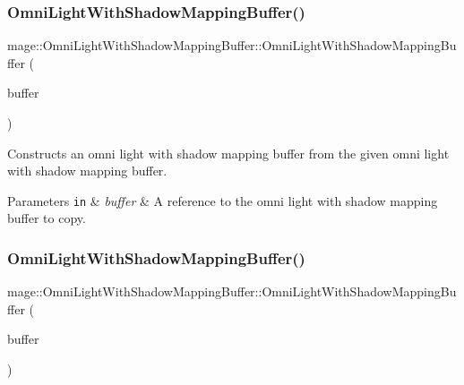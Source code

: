 \subsubsection{\texorpdfstring{Omni\+Light\+With\+Shadow\+Mapping\+Buffer()}{OmniLightWithShadowMappingBuffer()}\hspace{0.1cm}{\footnotesize\ttfamily [2/3]}}
{\footnotesize\ttfamily mage\+::\+Omni\+Light\+With\+Shadow\+Mapping\+Buffer\+::\+Omni\+Light\+With\+Shadow\+Mapping\+Buffer (\begin{DoxyParamCaption}\item[{const \hyperlink{structmage_1_1_omni_light_with_shadow_mapping_buffer}{Omni\+Light\+With\+Shadow\+Mapping\+Buffer} \&}]{buffer }\end{DoxyParamCaption})\hspace{0.3cm}{\ttfamily [default]}}

Constructs an omni light with shadow mapping buffer from the given omni light with shadow mapping buffer.


\begin{DoxyParams}[1]{Parameters}
\mbox{\tt in}  & {\em buffer} & A reference to the omni light with shadow mapping buffer to copy. \\
\hline
\end{DoxyParams}
\hypertarget{structmage_1_1_omni_light_with_shadow_mapping_buffer_afb66f7933b73e60c234dc89e3033271a}{}\label{structmage_1_1_omni_light_with_shadow_mapping_buffer_afb66f7933b73e60c234dc89e3033271a} 
\subsubsection{\texorpdfstring{Omni\+Light\+With\+Shadow\+Mapping\+Buffer()}{OmniLightWithShadowMappingBuffer()}\hspace{0.1cm}{\footnotesize\ttfamily [3/3]}}
{\footnotesize\ttfamily mage\+::\+Omni\+Light\+With\+Shadow\+Mapping\+Buffer\+::\+Omni\+Light\+With\+Shadow\+Mapping\+Buffer (\begin{DoxyParamCaption}\item[{\hyperlink{structmage_1_1_omni_light_with_shadow_mapping_buffer}{Omni\+Light\+With\+Shadow\+Mapping\+Buffer} \&\&}]{buffer }\end{DoxyParamCaption})\hspace{0.3cm}{\ttfamily [default]}}

